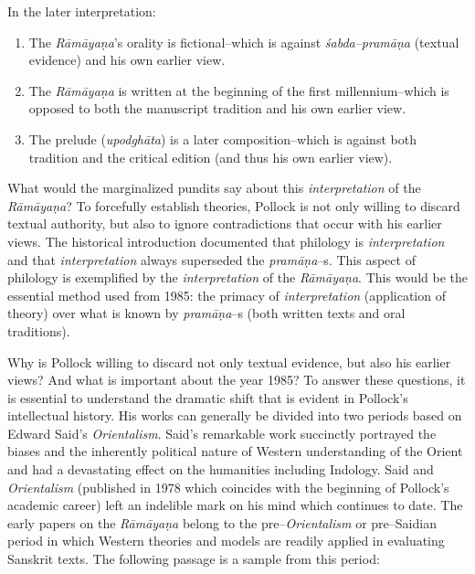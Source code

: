 In the later interpretation:

\begin{enumerate}
\itemsep=0pt
\item The \textit{Rāmāyaṇa}’s orality is fictional–which is against \textit{śabda–pramāṇa} (textual evidence) and his own earlier view.

 \item The \textit{Rāmāyaṇa }is written at the beginning of the first millennium–which is opposed to both the manuscript tradition and his own earlier view.

 \item The prelude (\textit{upodghāta}) is a later composition–which is against both tradition and the critical edition (and thus his own earlier view).

\end{enumerate}

What would the marginalized pundits say about this \textit{interpretation} of the \textit{Rāmāyaṇa}? To forcefully establish theories, Pollock is not only willing to discard textual authority, but also to ignore contradictions that occur with his earlier views. The historical introduction documented that philology is \textit{interpretation} and that \textit{interpretation }always superseded the \textit{pramāṇa}–s. This aspect of philology is exemplified by the \textit{interpretation }of the \textit{Rāmāyaṇa}. This would be the essential method used from 1985: the primacy of \textit{interpretation} (application of theory) over what is known by \textit{pramāṇa}–s (both written texts and oral traditions).

Why is Pollock willing to discard not only textual evidence, but also his earlier views? And what is important about the year 1985? To answer these questions, it is essential to understand the dramatic shift that is evident in Pollock’s intellectual history. His works can generally be divided into two periods based on Edward Said’s \textit{Orientalism}. Said’s remarkable work succinctly portrayed the biases and the inherently political nature of Western understanding of the Orient and had a devastating effect on the humanities including Indology. Said and \textit{Orientalism} (published in 1978 which coincides with the beginning of Pollock’s academic career) left an indelible mark on his mind which continues to date. The early papers on the \textit{Rāmāyaṇa} belong to the pre–\textit{Orientalism} or pre–Saidian period in which Western theories and models are readily applied in evaluating Sanskrit texts. The following passage is a sample from this period:

